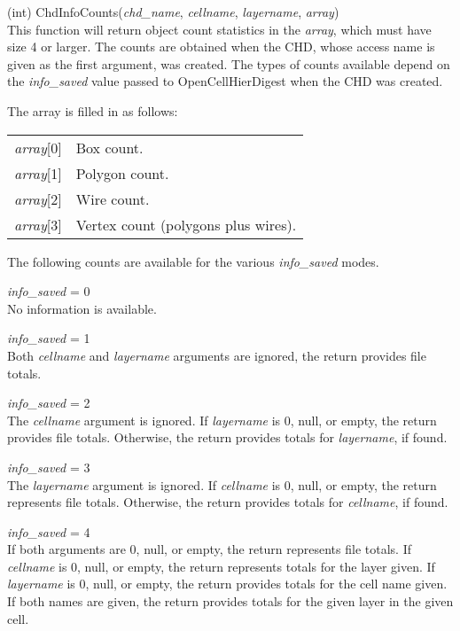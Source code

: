 \begin{description}
\item{(int) \vt ChdInfoCounts({\it chd\_name\/}, {\it cellname\/},
  {\it layername\/}, {\it array\/})}\\
This function will return object count statistics in the {\it
array\/}, which must have size 4 or larger.  The counts are obtained
when the CHD, whose access name is given as the first argument, was
created.  The types of counts available depend on the {\it
info\_saved} value passed to {\vt OpenCellHierDigest} when the CHD was
created.

The array is filled in as follows:

\begin{tabular}{ll}
{\it array\/}[0] & Box count.\\
{\it array\/}[1] & Polygon count.\\
{\it array\/}[2] & Wire count.\\
{\it array\/}[3] & Vertex count (polygons plus wires).\\
\end{tabular}

The following counts are available for the various {\it info\_saved}
modes.

\begin{description}
\item{\it info\_saved} = 0\\
No information is available.

\item{\it info\_saved} = 1\\
Both {\it cellname} and {\it layername} arguments are ignored, the
return provides file totals.

\item{\it info\_saved} = 2\\
The {\it cellname} argument is ignored.  If {\it layername} is 0,
null, or empty, the return provides file totals.  Otherwise, the
return provides totals for {\it layername}, if found.

\item{\it info\_saved} = 3\\
The {\it layername} argument is ignored.  If {\it cellname} is 0,
null, or empty, the return represents file totals.  Otherwise, the
return provides totals for {\it cellname}, if found.

\item{\it info\_saved} = 4\\
If both arguments are 0, null, or empty, the return represents file
totals.  If {\it cellname} is 0, null, or empty, the return represents
totals for the layer given.  If {\it layername} is 0, null, or empty,
the return provides totals for the cell name given.  If both names are
given, the return provides totals for the given layer in the given
cell.
\end{description}


\end{description}
